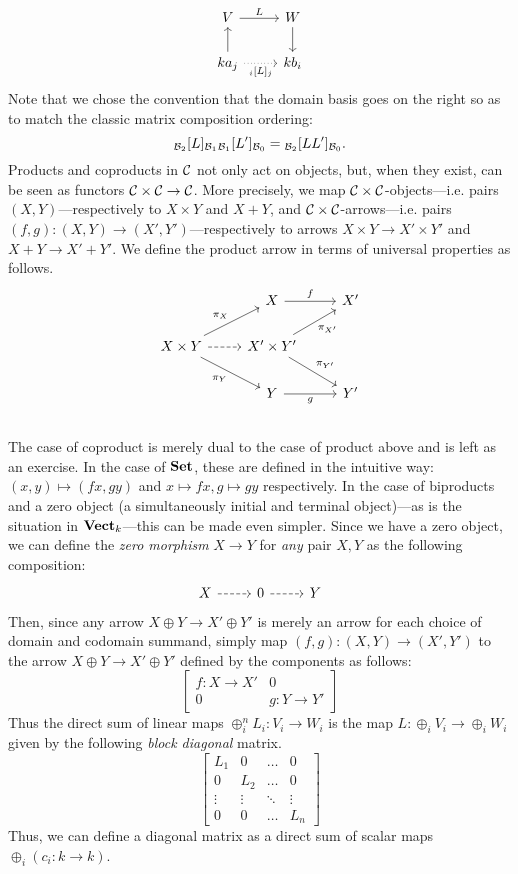 \[
\begin{tikzcd}
V \arrow[r,"L"] & W \arrow[d] \\
ka_j \arrow[u] \arrow[r,dotted,"\mtrx{i}{L}{j}"'] & kb_i
\end{tikzcd}
\]
Note that we chose the convention that the domain basis goes on the right so as to match the classic matrix composition ordering:
\[{}_{\mathcal{B}_2}[L]_{\mathcal{B}_1}{}_{\mathcal{B}_1}[L']_{\mathcal{B}_0}={}_{\mathcal{B}_2}[L L']_{\mathcal{B}_0}.\]
Products and coproducts in $\mathcal{C}$ not only act on objects, but, when they exist, can be seen as functors $\mathcal{C}\times\mathcal{C}\to\mathcal{C}$. More precisely, we map $\mathcal{C}\times\mathcal{C}$-objects---i.e. pairs $(X,Y)$---respectively to $X\times Y$ and $X+Y$, and $\mathcal{C}\times\mathcal{C}$-arrows---i.e. pairs $(f,g):(X,Y)\to (X',Y')$---respectively to arrows $X\times Y\to X'\times Y'$ and $X+Y\to X'+Y'$. We define the product arrow in terms of universal properties as follows.
\[
\begin{tikzcd}
& X \arrow[r,"f"] & X' \\
X\times Y \arrow[ur,"\pi_X"] \arrow[dr,"\pi_Y"'] \arrow[r,dashed] & X'\times Y' \arrow[ur,"\pi_{X'}"'] \arrow[dr,"\pi_{Y'}"] &   \\
& Y \arrow[r,"g"'] & Y'   \\
\end{tikzcd}
\]
The case of coproduct is merely dual to the case of product above and is left as an exercise. In the case of $\mathbf{Set}$, these are defined in the intuitive way: $(x,y)\mapsto (fx,gy)$ and $x\mapsto fx, g\mapsto gy$ respectively. In the case of biproducts and a zero object (a simultaneously initial and terminal object)---as is the situation in $\mathbf{Vect}_k$---this can be made even simpler. Since we have a zero object, we can define the \emph{zero morphism} $X\to Y$ for \emph{any} pair $X,Y$ as the following composition:
\[
\begin{tikzcd}
X \arrow[r,dashed] & 0 \arrow[r,dashed] & Y
\end{tikzcd}
\]
Then, since any arrow $X\oplus Y\to X'\oplus Y'$ is merely an arrow for each choice of domain and codomain summand, simply map $(f,g):(X,Y)\to (X',Y')$ to the arrow $X\oplus Y\to X'\oplus Y'$ defined by the components as follows:
\[
\begin{bmatrix}
f : X\to X' & 0 \\
0 & g : Y \to Y'
\end{bmatrix}
\]
Thus the direct sum of linear maps $\oplus_i^n L_i:V_i\to W_i$ is the map $L:\oplus_iV_i\to\oplus_iW_i$ given by the following \emph{block diagonal} matrix.
\[\begin{bmatrix}
L_1 & 0   & \dots & 0 \\ 
0   & L_2 & \dots & 0 \\
\vdots & \vdots &\ddots & \vdots  \\
0 & 0 & \dots & L_n
\end{bmatrix}
\]
Thus, we can define a diagonal matrix as a direct sum of scalar maps $\oplus_i(c_i:k\to k)$.

